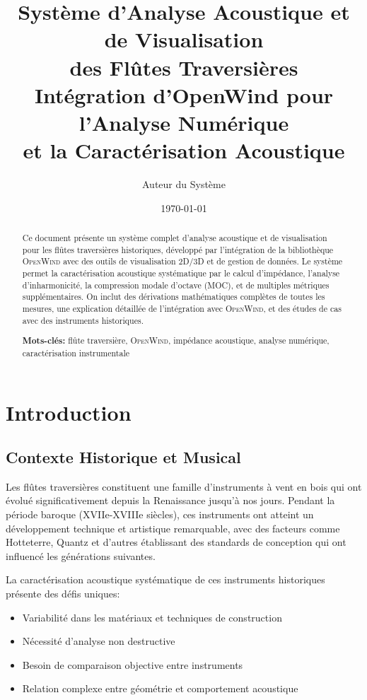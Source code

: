 \documentclass[12pt,a4paper,twocolumn]{article}
\title{\textbf{Système d'Analyse Acoustique et de Visualisation\\des Flûtes Traversières}\\
\large{Intégration d'OpenWind pour l'Analyse Numérique\\et la Caractérisation Acoustique}}
\author{Auteur du Système}
\date{\today}
\newcommand{\openwind}{\textsc{OpenWind}}
\begin{document}
\maketitle

\begin{abstract}
Ce document présente un système complet d'analyse acoustique et de visualisation pour les flûtes traversières historiques, développé par l'intégration de la bibliothèque \openwind{} avec des outils de visualisation 2D/3D et de gestion de données. Le système permet la caractérisation acoustique systématique par le calcul d'impédance, l'analyse d'inharmonicité, la compression modale d'octave (MOC), et de multiples métriques supplémentaires. On inclut des dérivations mathématiques complètes de toutes les mesures, une explication détaillée de l'intégration avec \openwind{}, et des études de cas avec des instruments historiques.

\vspace{0.3cm}
\textbf{Mots-clés:} flûte traversière, \openwind{}, impédance acoustique, analyse numérique, caractérisation instrumentale
\end{abstract}

\tableofcontents
\newpage

\section{Introduction}

\subsection{Contexte Historique et Musical}

Les flûtes traversières constituent une famille d'instruments à vent en bois qui ont évolué significativement depuis la Renaissance jusqu'à nos jours. Pendant la période baroque (XVIIe-XVIIIe siècles), ces instruments ont atteint un développement technique et artistique remarquable, avec des facteurs comme Hotteterre, Quantz et d'autres établissant des standards de conception qui ont influencé les générations suivantes.

La caractérisation acoustique systématique de ces instruments historiques présente des défis uniques:
\begin{itemize}
    \item Variabilité dans les matériaux et techniques de construction
    \item Nécessité d'analyse non destructive
    \item Besoin de comparaison objective entre instruments
    \item Relation complexe entre géométrie et comportement acoustique
\end{itemize}
\end{document}
